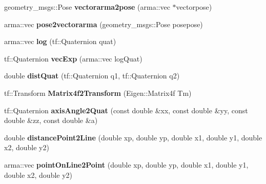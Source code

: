 \begin{DoxyCompactItemize}
\item 
\hypertarget{namespacekukadu_af4b115434fc557d1a59c92930043bf99}{geometry\-\_\-msgs\-::\-Pose {\bfseries vectorarma2pose} (arma\-::vec $\ast$vectorpose)}\label{namespacekukadu_af4b115434fc557d1a59c92930043bf99}

\item 
\hypertarget{namespacekukadu_a5d082f90195542c29ee20a98405dbe31}{arma\-::vec {\bfseries pose2vectorarma} (geometry\-\_\-msgs\-::\-Pose posepose)}\label{namespacekukadu_a5d082f90195542c29ee20a98405dbe31}

\item 
\hypertarget{namespacekukadu_afa6b425e55df9de457d99c40faad535d}{arma\-::vec {\bfseries log} (tf\-::\-Quaternion quat)}\label{namespacekukadu_afa6b425e55df9de457d99c40faad535d}

\item 
\hypertarget{namespacekukadu_a537c94326e5aafb4c5199c7026155621}{tf\-::\-Quaternion {\bfseries vec\-Exp} (arma\-::vec log\-Quat)}\label{namespacekukadu_a537c94326e5aafb4c5199c7026155621}

\item 
\hypertarget{namespacekukadu_a018eda78a059f23e3bc945b10d2e3cfc}{double {\bfseries dist\-Quat} (tf\-::\-Quaternion q1, tf\-::\-Quaternion q2)}\label{namespacekukadu_a018eda78a059f23e3bc945b10d2e3cfc}

\item 
\hypertarget{namespacekukadu_acf90cbb6df534c52bb47691360c3fad3}{tf\-::\-Transform {\bfseries Matrix4f2\-Transform} (Eigen\-::\-Matrix4f Tm)}\label{namespacekukadu_acf90cbb6df534c52bb47691360c3fad3}

\item 
\hypertarget{namespacekukadu_a380906e9d4452baf8a8ba8d6dd2495f6}{tf\-::\-Quaternion {\bfseries axis\-Angle2\-Quat} (const double \&xx, const double \&yy, const double \&zz, const double \&a)}\label{namespacekukadu_a380906e9d4452baf8a8ba8d6dd2495f6}

\item 
\hypertarget{namespacekukadu_a228221f75f3f3f319b2d957be2308935}{double {\bfseries distance\-Point2\-Line} (double xp, double yp, double x1, double y1, double x2, double y2)}\label{namespacekukadu_a228221f75f3f3f319b2d957be2308935}

\item 
\hypertarget{namespacekukadu_a67c10a1b48929f4eba41cb9d7783fa6f}{arma\-::vec {\bfseries point\-On\-Line2\-Point} (double xp, double yp, double x1, double y1, double x2, double y2)}\label{namespacekukadu_a67c10a1b48929f4eba41cb9d7783fa6f}


\end{DoxyCompactItemize}
